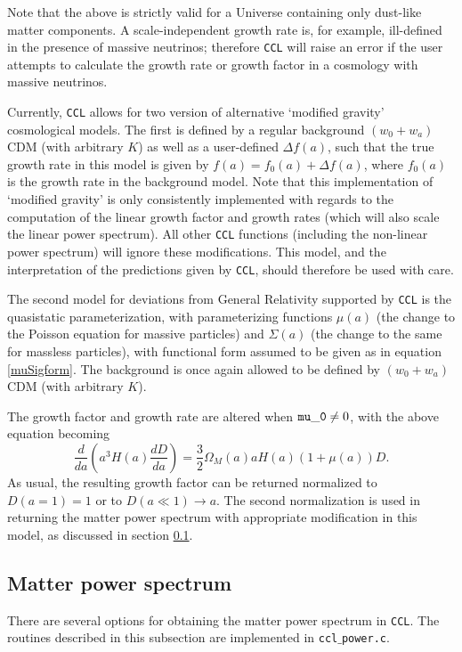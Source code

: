 \documentclass[\docopts]{\docclass}
\newcommand{\ccl}{{\tt CCL}\xspace}
\begin{document}
Note that the above is strictly valid for a Universe containing only dust-like matter components. A scale-independent growth rate is, for example, ill-defined in the presence of massive neutrinos; therefore \ccl will raise an error if the user attempts to calculate the growth rate or growth factor in a cosmology with massive neutrinos.

Currently, \ccl allows for two version of alternative `modified gravity' cosmological models. The first is defined by a regular background $(w_0+w_a)$CDM (with arbitrary $K$) as well as a user-defined $\Delta f(a)$, such that the true growth rate in this model is given by $f(a)=f_0(a)+\Delta f(a)$, where $f_0(a)$ is the growth rate in the background model. Note that this implementation of `modified gravity' is only consistently implemented with regards to the computation of the linear growth factor and growth rates (which will also scale the linear power spectrum). All other \ccl functions (including the non-linear power spectrum) will ignore these modifications. This model, and the interpretation of the predictions given by \ccl, should therefore be used with care.

The second model for deviations from General Relativity supported by \ccl is the quasistatic parameterization, with parameterizing functions $\mu(a)$ (the change to the Poisson equation for massive particles) and $\Sigma(a)$ (the change to the same for massless particles), with functional form assumed to be given as in equation \ref{muSigform}. The background is once again allowed to be defined by $(w_0+w_a)$CDM (with arbitrary $K$). 

The growth factor and growth rate are altered when ${\tt mu\_0} \ne 0$, with the above equation becoming
\begin{equation}
  \frac{d}{da}\left(a^3H(a)\frac{dD}{da}\right)=\frac{3}{2}\Omega_M(a)aH(a)(1 + \mu(a))D.
\end{equation}
As usual, the resulting growth factor can be returned normalized to $D(a=1)=1$ or to $D(a\ll1)\rightarrow a$. The second normalization is used in returning the matter power spectrum with appropriate modification in this model, as discussed in section \ref{sec:power}.

\subsection{Matter power spectrum}
\label{sec:power}

There are several options for obtaining the matter power spectrum in \ccl.
The routines described in this subsection are implemented in {\tt ccl$\_$power.c}.
\end{document}
